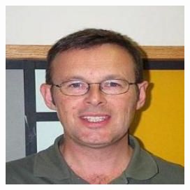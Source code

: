 \documentclass{article}
\begin{document}
\begin{center}
\begin{minipage}{0.142\textwidth}
    \end{minipage}%
    \begin{minipage}{0.142\textwidth}
        \includegraphics[width=\linewidth]{./pic/misclassified_r6_p4_2723.jpg}
    \end{minipage}%

    \label{fig:misclassified}
\end{center}
\end{document}
